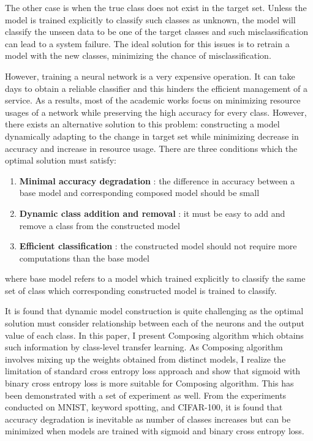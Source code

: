 \documentclass{article}
\begin{document}
The other case is when the true class does not exist in the target set. Unless the model is trained explicitly to classify such classes as unknown, the model will classify the unseen data to be one of the target classes and such misclassification can lead to a system failure. The ideal solution for this issues is to retrain a model with the new classes, minimizing the chance of misclassification.

However, training a neural network is a very expensive operation. It can take days to obtain a reliable classifier and this hinders the efficient management of a service. As a results, most of the academic works focus on minimizing resource usages of a network while preserving the high accuracy for every class. However, there exists an alternative solution to this problem: constructing a model dynamically adapting to the change in target set while minimizing decrease in accuracy and increase in resource usage. There are three conditions which the optimal solution must satisfy:

\begin{enumerate}
    \item \textbf{Minimal accuracy degradation} : the difference in accuracy between a base model and corresponding composed model should be small
    \item \textbf{Dynamic class addition and removal} : it must be easy to add and remove a class from the constructed model
    \item \textbf{Efficient classification} : the constructed model should not require more computations than the base model
\end{enumerate}

where base model refers to a model which trained explicitly to classify the same set of class which corresponding constructed model is trained to classify.

It is found that dynamic model construction is quite challenging as the optimal solution must consider relationship between each of the neurons and the output value of each class. In this paper, I present Composing algorithm which obtains such information by class-level transfer learning. As Composing algorithm involves mixing up the weights obtained from distinct models, I realize the limitation of standard cross entropy loss approach and show that sigmoid with binary cross entropy loss is more suitable for Composing algorithm. This has been demonstrated with a set of experiment as well. From the experiments conducted on MNIST, keyword spotting, and CIFAR-100, it is found that accuracy degradation is inevitable as number of classes increases but can be minimized when models are trained with sigmoid and binary cross entropy loss.
\end{document}
